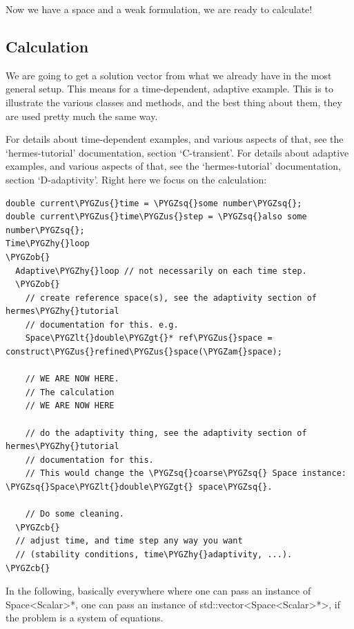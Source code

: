 \documentclass[a4paper,0pt,english]{sphinxmanual}
\def\PYGZus{\char`\_}
\def\PYGZob{\char`\{}
\def\PYGZcb{\char`\}}
\def\PYGZam{\char`\&}
\def\PYGZlt{\char`\<}
\def\PYGZgt{\char`\>}
\def\PYGZhy{\char`\-}
\def\PYGZsq{\char`\'}
\begin{document}
Now we have a space and a weak formulation, we are ready to calculate!


\subsection{Calculation}
\label{src/typical_example/calculation:calculation}\label{src/typical_example/calculation::doc}
We are going to get a solution vector from what we already have in the most general setup. This means for a time-dependent, adaptive example.
This is to illustrate the various classes and methods, and the best thing about them, they are used pretty much the same way.

For details about time-dependent examples, and various aspects of that, see the `hermes-tutorial' documentation, section `C-transient'.
For details about adaptive examples, and various aspects of that, see the `hermes-tutorial' documentation, section `D-adaptivity'.
Right here we focus on the calculation:

\begin{Verbatim}[commandchars=\\\{\}]
double current\PYGZus{}time = \PYGZsq{}some number\PYGZsq{};
double current\PYGZus{}time\PYGZus{}step = \PYGZsq{}also some number\PYGZsq{};
Time\PYGZhy{}loop
\PYGZob{}
  Adaptive\PYGZhy{}loop // not necessarily on each time step.
  \PYGZob{}
    // create reference space(s), see the adaptivity section of hermes\PYGZhy{}tutorial
    // documentation for this. e.g.
    Space\PYGZlt{}double\PYGZgt{}* ref\PYGZus{}space = construct\PYGZus{}refined\PYGZus{}space(\PYGZam{}space);

    // WE ARE NOW HERE.
    // The calculation
    // WE ARE NOW HERE

    // do the adaptivity thing, see the adaptivity section of hermes\PYGZhy{}tutorial
    // documentation for this.
    // This would change the \PYGZsq{}coarse\PYGZsq{} Space instance: \PYGZsq{}Space\PYGZlt{}double\PYGZgt{} space\PYGZsq{}.

    // Do some cleaning.
  \PYGZcb{}
  // adjust time, and time step any way you want
  // (stability conditions, time\PYGZhy{}adaptivity, ...).
\PYGZcb{}
\end{Verbatim}

In the following, basically everywhere where one can pass an instance of Space\textless{}Scalar\textgreater{}*, one can pass
an instance of std::vector\textless{}Space\textless{}Scalar\textgreater{}*\textgreater{}, if the problem is a system of equations.
\end{document}
